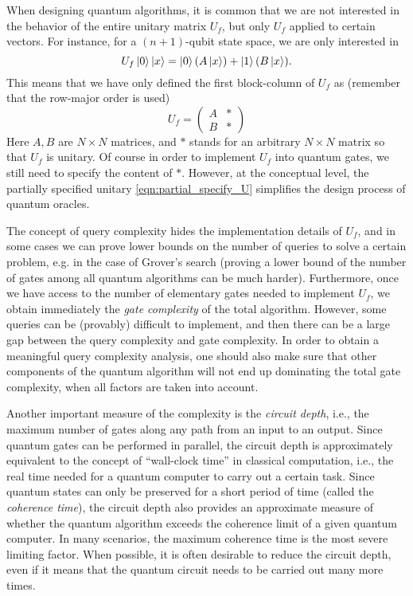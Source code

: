 \begin{exam}
When designing quantum algorithms, it is common that we are not interested in the behavior of the entire unitary matrix $U_f$, but only $U_f$ applied to certain vectors. For instance, for a $(n+1)$-qubit state space, we are only interested in 
\begin{equation}
U_f\ket{0}\ket{x}=\ket{0}(A\ket{x})+\ket{1}(B\ket{x}).
\label{eqn:partial_specify_U}
\end{equation}
This means that we have only defined the first block-column of $U_f$ as (remember that the row-major order is used)
\begin{equation}
U_f=\begin{pmatrix}
A & *\\
B & *
\end{pmatrix}
\end{equation}
Here $A,B$ are $N\times N$ matrices, and $*$ stands for an arbitrary $N\times N$ matrix so that $U_f$ is unitary. 
Of course in order to implement $U_f$ into quantum gates, we still need to specify the content of $*$. 
However, at the conceptual level, the partially specified unitary \eqref{eqn:partial_specify_U} simplifies the design process of quantum oracles.
\end{exam}

The concept of query complexity hides the implementation details of $U_f$, and in some cases we can prove lower bounds on the number of queries to solve a certain problem, e.g. in the case of Grover's search (proving a lower bound of the number of gates among all quantum algorithms can be much harder). Furthermore, once we have access to the number of elementary gates needed to implement $U_f$, we obtain immediately the \textit{gate complexity} of the total algorithm. However, some queries can be (provably) difficult to implement, and then there can be a large gap between the query complexity and gate complexity. In order to obtain a meaningful query complexity analysis, one should also make sure that other components of the quantum algorithm will not end up dominating the total gate complexity, when all factors are taken into account.

Another important measure of the complexity is the \textit{circuit depth}, i.e., the maximum number of gates along any path from an input to an output. Since quantum gates can be performed in parallel, the circuit depth is approximately equivalent to the concept of ``wall-clock time'' in classical computation, i.e., the real time needed for a quantum computer to carry out a certain task.
Since quantum states can only be preserved for a short period of time (called the \textit{coherence time}), the circuit depth also provides an approximate measure of whether the quantum algorithm exceeds the coherence limit of a given quantum computer. In many scenarios, the maximum coherence time is the most severe limiting factor. When possible, it is often desirable to reduce the circuit depth, even if it means that the quantum circuit needs to be carried out many more times.


